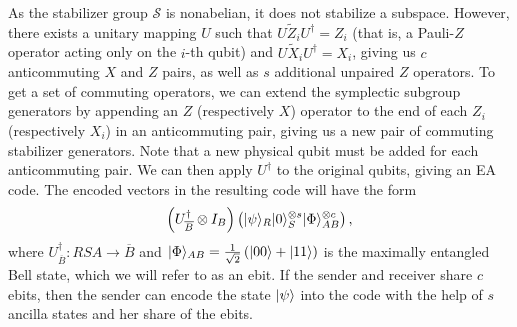 \documentclass[]{amsart}
\DeclarePairedDelimiter\ket{\lvert}{\rangle}
\begin{document}
As the stabilizer group $\mathcal{S}$ is nonabelian, it does not stabilize a subspace.
However, there exists a unitary mapping $U$ such that $U\widetilde{Z}_iU^\dagger=Z_i$ (that is, a Pauli-$Z$ operator acting only on the $i$-th qubit) and $U\widetilde{X}_iU^\dagger=X_i$, giving us $c$ anticommuting $X$ and $Z$ pairs, as well as $s$ additional unpaired $Z$ operators.
To get a set of commuting operators, we can extend the symplectic subgroup generators by appending an $Z$ (respectively $X$) operator to the end of each $Z_i$ (respectively $X_i$) in an anticommuting pair, giving us a new pair of commuting stabilizer generators.
Note that a new physical qubit must be added for each anticommuting pair.
We can then apply $U^\dagger$ to the original qubits, giving an EA code.
The encoded vectors in the resulting code will have the form
\begin{equation}
    \left(U_{\overline{B}}^\dagger\otimes I_B\right)\left(\ket{\psi}_R\ket{0}_{S}^{\otimes s}\ket{\Phi}_{AB}^{\otimes c}\right),
\end{equation}
where $U_{\overline{B}}^\dagger:RSA\rightarrow\overline{B}$ and $\ket{\Phi}_{AB}=\frac{1}{\sqrt{2}}\left(\ket{00}+\ket{11}\right)$ is the maximally entangled Bell state, which we will refer to as an ebit.
If the sender and receiver share $c$ ebits, then the sender can encode the state $\ket{\psi}$ into the code with the help of $s$ ancilla states and her share of the ebits.
\end{document}
